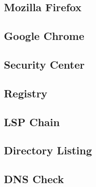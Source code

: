 \subsection{Mozilla Firefox}

\subsection{Google Chrome}

\subsection{Security Center}

\subsection{Registry}
\subsection{LSP Chain}

\subsection{Directory Listing}

\subsection{DNS Check}
